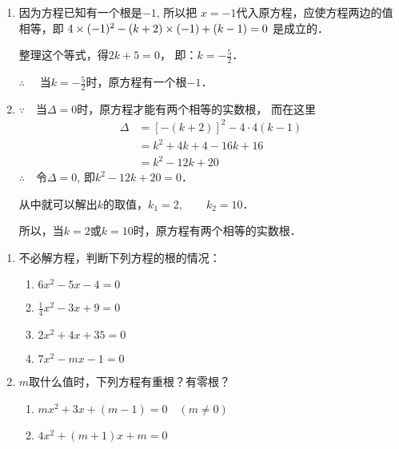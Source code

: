\begin{solution}
\begin{enumerate}
    \item 因为方程已知有一个根是$-1$, 所以把
$x=-1$代入原方程，应使方程两边的值相等，即
$4\times(-1)^2-(k+2)\times(-1)+(k-1)=0$ 是成立的．

整理这个等式，得$2k+5=0$，
即：$k=-\frac{5}{2}$．

$\therefore\quad $ 当$k=-\frac{5}{2}$时，原方程有一个根$-1$．

\item $\because\quad $当$\Delta =0$时，原方程才能有两个相等的实数根，
而在这里
\[\begin{split}
    \Delta &=[-(k+2)]^2-4\cdot 4(k-1)\\
    &=k^2+4k+4-16k+16\\
    &=k^2-12k+20
\end{split}\]
$\therefore\quad $令$\Delta=0$, 即$k^2-12k+20=0$．

从中就可以解出$k$的取值，$k_1=2,\qquad k_2=10$．

所以，当$k=2$或$k=10$时，原方程有两个相等的实数根．

\end{enumerate}
\end{solution}

\begin{ex}
\begin{enumerate}
    \item 不必解方程，判断下列方程的根的情况：
    \begin{multicols}{2}
    \begin{enumerate}
        \item $6x^2-5x-4=0$
        \item $\frac{1}{4}x^2-3x+9=0$
        \item $2x^2+4x+35=0$
        \item $7x^2-mx-1=0$
    \end{enumerate}
    \end{multicols}
    
    \item $m$取什么值时，下列方程有重根？有零根？
    \begin{enumerate}
        \item $mx^2+3x+(m-1)=0\quad  (m\ne 0)$
        \item $4x^2+(m+1)x+m=0$
    \end{enumerate}
\end{enumerate}
\end{ex}

